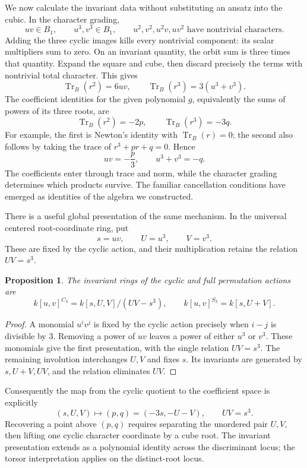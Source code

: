 \documentclass[11pt]{article}
\newtheorem{proposition}{Proposition}[section]
\theoremstyle{remark}
\begin{document}
We now calculate the invariant data without substituting an ansatz into the cubic. In the character grading,
\[
uv\in B_1,\qquad u^3,v^3\in B_1,
\qquad u^2,v^2,u^2v,uv^2\text{ have nontrivial characters}.
\]
Adding the three cyclic images kills every nontrivial component: its scalar multipliers sum to zero. On an invariant quantity, the orbit sum is three times that quantity. Expand the square and cube, then discard precisely the terms with nontrivial total character. This gives
\[
\operatorname{Tr}_{B}(r^2)=6uv,
\qquad
\operatorname{Tr}_{B}(r^3)=3(u^3+v^3).
\]
The coefficient identities for the given polynomial \(g\), equivalently the sums of powers of its three roots, are
\[
\operatorname{Tr}_{B}(r^2)=-2p,
\qquad
\operatorname{Tr}_{B}(r^3)=-3q.
\]
For example, the first is Newton's identity with \(\operatorname{Tr}_{B}(r)=0\); the second also follows by taking the trace of \(r^3+pr+q=0\). Hence
\begin{equation}
uv=-\frac p3,\qquad u^3+v^3=-q.
\label{eq:cardano-constraints}
\end{equation}
The coefficients enter through trace and norm, while the character grading determines which products survive. The familiar cancellation conditions have emerged as identities of the algebra we constructed.

There is a useful global presentation of the same mechanism. In the universal centered root-coordinate ring, put
\[
s=uv,\qquad U=u^3,\qquad V=v^3.
\]
These are fixed by the cyclic action, and their multiplication retains the relation \(UV=s^3\).

\begin{proposition}
The invariant rings of the cyclic and full permutation actions are
\begin{equation}
k[u,v]^{C_3}=k[s,U,V]/(UV-s^3),
\qquad
k[u,v]^{S_3}=k[s,U+V].
\label{eq:cubic-invariants}
\end{equation}
\end{proposition}

\begin{proof}
A monomial \(u^iv^j\) is fixed by the cyclic action precisely when \(i-j\) is divisible by \(3\). Removing a power of \(uv\) leaves a power of either \(u^3\) or \(v^3\). These monomials give the first presentation, with the single relation \(UV=s^3\). The remaining involution interchanges \(U,V\) and fixes \(s\). Its invariants are generated by \(s,U+V,UV\), and the relation eliminates \(UV\).
\end{proof}

Consequently the map from the cyclic quotient to the coefficient space is explicitly
\[
(s,U,V)\longmapsto(p,q)=(-3s,-U-V),
\qquad UV=s^3.
\]
Recovering a point above \((p,q)\) requires separating the unordered pair \(U,V\), then lifting one cyclic character coordinate by a cube root. The invariant presentation extends as a polynomial identity across the discriminant locus; the torsor interpretation applies on the distinct-root locus.
\end{document}
